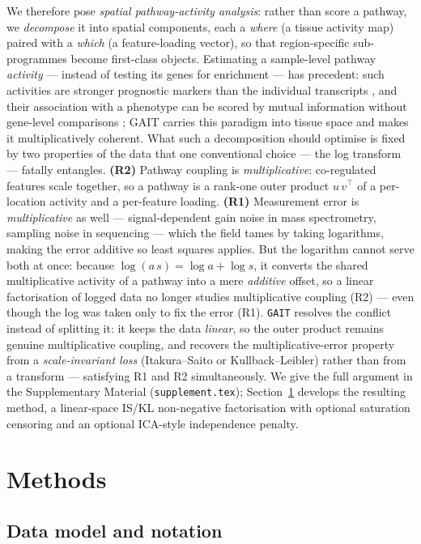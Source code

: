 \documentclass[11pt]{article}
\newcommand{\code}[1]{\texttt{#1}}
\begin{document}
We therefore pose \emph{spatial pathway-activity analysis}: rather than score a pathway, we
\emph{decompose} it into spatial components, each a \emph{where} (a tissue activity map)
paired with a \emph{which} (a feature-loading vector), so that region-specific sub-programmes
become first-class objects. Estimating a sample-level pathway \emph{activity} --- instead of
testing its genes for enrichment --- has precedent: such activities are stronger prognostic
markers than the individual transcripts \citep{jeuken2022}, and their association with a
phenotype can be scored by mutual information without gene-level comparisons
\citep{jeuken2024}; GAIT carries this paradigm into tissue space and makes it
multiplicatively coherent. What such a decomposition should optimise is fixed by two
properties of the data that one conventional choice --- the log transform --- fatally
entangles. \textbf{(R2)} Pathway coupling is \emph{multiplicative}: co-regulated features
scale together, so a pathway is a rank-one outer product $u\,v^{\!\top}$ of a per-location
activity and a per-feature loading. \textbf{(R1)} Measurement error is \emph{multiplicative}
as well --- signal-dependent gain noise in mass spectrometry, sampling noise in sequencing
--- which the field tames by taking logarithms, making the error additive so least squares
applies. But the logarithm cannot serve both at once: because $\log(a\,s) = \log a + \log s$,
it converts the shared multiplicative activity of a pathway into a mere \emph{additive}
offset, so a linear factorisation of logged data no longer studies multiplicative coupling
(R2) --- even though the log was taken only to fix the error (R1). \code{GAIT} resolves
the conflict instead of splitting it: it keeps the data \emph{linear}, so the outer product
remains genuine multiplicative coupling, and recovers the multiplicative-error property from a
\emph{scale-invariant loss} (Itakura--Saito or Kullback--Leibler) rather than from a transform
--- satisfying R1 and R2 simultaneously. We give the full argument in the Supplementary
Material (\code{supplement.tex}); Section~\ref{sec:methods} develops the resulting method, a
linear-space IS/KL non-negative factorisation with optional saturation censoring and an
optional ICA-style independence penalty.

\section{Methods}
\label{sec:methods}

\subsection{Data model and notation}
\label{sec:notation}
\end{document}
